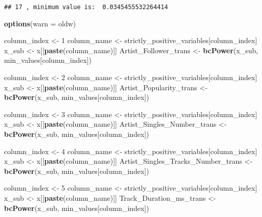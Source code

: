 \documentclass[
]{article}
\newenvironment{Shaded}{\begin{snugshade}}{\end{snugshade}}
\newcommand{\DataTypeTok}[1]{\textcolor[rgb]{0.13,0.29,0.53}{#1}}
\newcommand{\DecValTok}[1]{\textcolor[rgb]{0.00,0.00,0.81}{#1}}
\newcommand{\KeywordTok}[1]{\textcolor[rgb]{0.13,0.29,0.53}{\textbf{#1}}}
\newcommand{\NormalTok}[1]{#1}
\newcommand{\StringTok}[1]{\textcolor[rgb]{0.31,0.60,0.02}{#1}}
\begin{document}
\begin{verbatim}
## 17 , minimum value is:  0.0345455532264414
\end{verbatim}

\begin{Shaded}
\begin{Highlighting}[]
\KeywordTok{options}\NormalTok{(}\DataTypeTok{warn =}\NormalTok{ oldw)}
\end{Highlighting}
\end{Shaded}

\begin{Shaded}
\begin{Highlighting}[]
\NormalTok{column_index <-}\StringTok{ }\DecValTok{1}
\NormalTok{column_name <-}\StringTok{ }\NormalTok{strictly_positive_variables[column_index]}
\NormalTok{x_sub <-}\StringTok{ }\NormalTok{x[[}\KeywordTok{paste}\NormalTok{(column_name)]]}
\NormalTok{Artist_Follower_trans <-}\StringTok{ }\KeywordTok{bcPower}\NormalTok{(x_sub, min_values[column_index])}

\NormalTok{column_index <-}\StringTok{ }\DecValTok{2}
\NormalTok{column_name <-}\StringTok{ }\NormalTok{strictly_positive_variables[column_index]}
\NormalTok{x_sub <-}\StringTok{ }\NormalTok{x[[}\KeywordTok{paste}\NormalTok{(column_name)]]}
\NormalTok{Artist_Popularity_trans <-}\StringTok{ }\KeywordTok{bcPower}\NormalTok{(x_sub, min_values[column_index])}

\NormalTok{column_index <-}\StringTok{ }\DecValTok{3}
\NormalTok{column_name <-}\StringTok{ }\NormalTok{strictly_positive_variables[column_index]}
\NormalTok{x_sub <-}\StringTok{ }\NormalTok{x[[}\KeywordTok{paste}\NormalTok{(column_name)]]}
\NormalTok{Artist_Singles_Number_trans <-}\StringTok{ }\KeywordTok{bcPower}\NormalTok{(x_sub, min_values[column_index])}

\NormalTok{column_index <-}\StringTok{ }\DecValTok{4}
\NormalTok{column_name <-}\StringTok{ }\NormalTok{strictly_positive_variables[column_index]}
\NormalTok{x_sub <-}\StringTok{ }\NormalTok{x[[}\KeywordTok{paste}\NormalTok{(column_name)]]}
\NormalTok{Artist_Singles_Tracks_Number_trans <-}\StringTok{ }\KeywordTok{bcPower}\NormalTok{(x_sub, min_values[column_index])}

\NormalTok{column_index <-}\StringTok{ }\DecValTok{5}
\NormalTok{column_name <-}\StringTok{ }\NormalTok{strictly_positive_variables[column_index]}
\NormalTok{x_sub <-}\StringTok{ }\NormalTok{x[[}\KeywordTok{paste}\NormalTok{(column_name)]]}
\NormalTok{Track_Duration_ms_trans <-}\StringTok{ }\KeywordTok{bcPower}\NormalTok{(x_sub, min_values[column_index])}


\end{Highlighting}
\end{Shaded}
\end{document}
